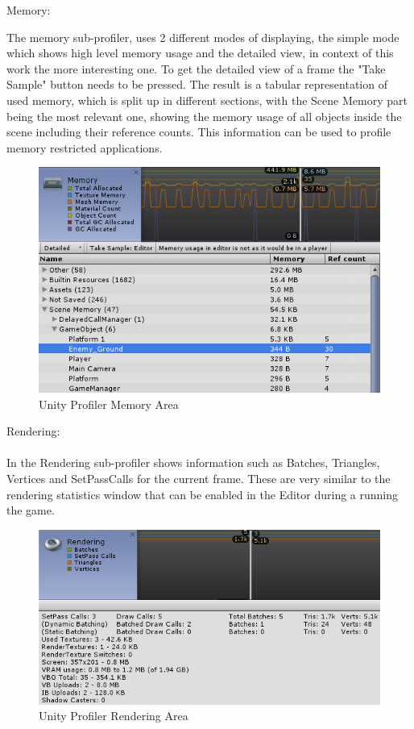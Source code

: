 Memory:

The memory sub-profiler, uses 2 different modes of displaying, the simple mode which shows high level memory usage and the detailed view, in context of this work the more interesting one. To get the detailed view of a frame the "Take Sample" button needs to be pressed. The result is a tabular representation of used memory, which is split up in different sections, with the Scene Memory part being the most relevant one, showing the memory usage of all objects inside the scene including their reference counts. This information can be used to profile memory restricted applications.\\

\begin{figure}[htbp]
\includegraphics[scale = 0.53]{img/UnityProfilerMemory.PNG}
\caption{Unity Profiler Memory Area}
\label{fig:UnityProfilerMemory}
\end{figure}

Rendering:\\
\\
In the Rendering sub-profiler shows information such as Batches, Triangles, Vertices and SetPassCalls for the current frame. These are very similar to the rendering statistics window that can be enabled in the Editor during a running the game.

\begin{figure}[htbp]
\includegraphics[scale = 0.53]{img/UnityProfilerRendering.PNG}
\caption{Unity Profiler Rendering Area}
\label{fig:UnityProfilerRendering}
\end{figure}

